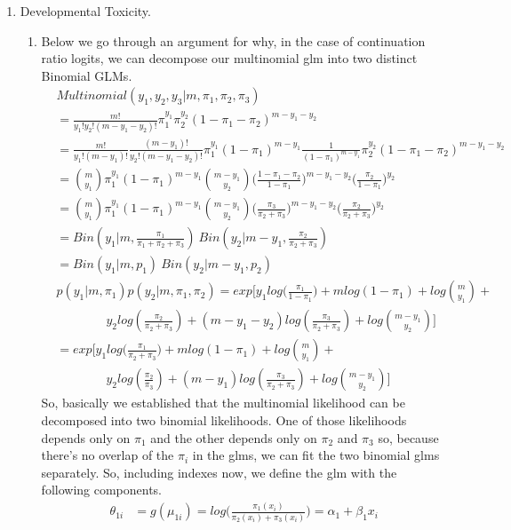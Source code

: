 \documentclass[12pt]{article}
\begin{document}
\begin{enumerate}
\item Developmental Toxicity. \\
\begin{enumerate}
	\item Below we go through an argument for why, in the case of continuation ratio logits, we can decompose our multinomial glm into two distinct Binomial GLMs. 
	\begin{align*}
	&Multinomial(y_1, y_2, y_3|m, \pi_1, \pi_2, \pi_3) \\&= \frac{m!}{y_1!y_2!(m-y_1 - y_2)!}\pi_1^{y_1}\pi_2^{y_2} (1- \pi_1 - \pi_2)^{m-y_1-y_2} \\
	&=\frac{m!}{y_1!(m-y_1)!} \frac{(m-y_1)!}{y_2!(m-y_1-y_2)!}\pi_1^{y_1}(1-\pi_1)^{m-y_1} \frac{1}{(1-\pi_1)^{m-y_1}} \pi_2^{y_2}(1-\pi_1-\pi_2)^{m-y_1-y_2} \\
	&= \binom{m}{y_1} \pi_1^{y_1}(1-\pi_1)^{m-y_1} \binom{m-y_1}{y_2}\bigg(\frac{1-\pi_1-\pi_2}{1-\pi_1}\bigg)^{m-y_1-y_2} \bigg(\frac{\pi_2}{1-\pi_1}\bigg)^{y_2} \\
	&= \binom{m}{y_1} \pi_1^{y_1}(1-\pi_1)^{m-y_1} \binom{m-y_1}{y_2}\bigg(\frac{\pi_3}{\pi_2 + \pi_3}\bigg)^{m-y_1-y_2} \bigg(\frac{\pi_2}{\pi_2 + \pi_3}\bigg)^{y_2} \\
	&= Bin(y_1|m, \frac{\pi_1}{\pi_1 + \pi_2 +\pi_3})\ Bin(y_2|m-y_1, \frac{\pi_2}{\pi_2 + \pi_3}) \\
	&= Bin(y_1|m, p_1)\ Bin(y_2|m-y_1, p_2) \\
	&p(y_1|m, \pi_1)p(y_2|m, \pi_1, \pi_2) = exp\bigg[y_1log\bigg(\frac{\pi_1}{1-\pi_1}\bigg) + mlog(1-\pi_1) + log\binom{m}{y_1}+ \\
	&\qquad\qquad y_2 log(\frac{\pi_2}{\pi_2 + \pi_3}) + (m- y_1 - y_2)log(\frac{\pi_3}{\pi_2 + \pi_3}) + log\binom{m-y_1}{y_2}\bigg] \\ 
	&= exp\bigg[y_1log\bigg(\frac{\pi_1}{\pi_2 + \pi_3}\bigg) + mlog(1-\pi_1) + log\binom{m}{y_1}+ \\ 
	&\qquad\qquad y_2 log(\frac{\pi_2}{\pi_3}) + (m-y_1)log(\frac{\pi_3}{\pi_2 + \pi_3}) + log\binom{m-y_1}{y_2} \bigg]
	\end{align*}
	So, basically we established that the multinomial likelihood can be decomposed into two binomial likelihoods. One of those likelihoods depends only on $\pi_1$ and the other depends only on $\pi_2$ and $\pi_3$ so, because there's no overlap of the $\pi_i$ in the glms, we can fit the two binomial glms separately. 
	So, including indexes now, we define the glm with the following components. 
	\begin{align*}
	\theta_{1i} &= g(\mu_{1i}) = log\bigg(\frac{\pi_1(x_i)}{\pi_2(x_i) + \pi_3(x_i)}\bigg) = \alpha_1 + \beta_1 x_i\\

\end{align*}
\end{enumerate}
\end{enumerate}
\end{document}
